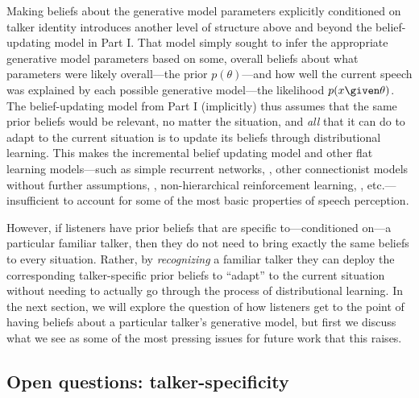 \label{r2-talker-spec-novelty}
Making beliefs about the generative model parameters explicitly conditioned on talker identity introduces another level of structure above and beyond the belief-updating model in Part I.  That model simply sought to infer the appropriate generative model parameters based on some, overall beliefs about what parameters were likely overall---the prior $p(\theta)$---and how well the current speech was explained by each possible generative model---the likelihood $p(x \given \theta)$.  The belief-updating model from Part I (implicitly) thus assumes that the same prior beliefs would be relevant, no matter the situation, and \emph{all} that it can do to adapt to the current situation is to update its beliefs through distributional learning.  This makes the incremental belief updating model and other flat learning models---such as simple recurrent networks, \autocite{Chang2006,Elman1990}, other connectionist models without further assumptions, \autocite{Mirman2006,Lancia2013}, non-hierarchical reinforcement learning, \autocite{Gallistel2001}, etc.---insufficient to account for some of the most basic properties of speech perception.

However, if listeners have prior beliefs that are specific to---conditioned on---a particular familiar talker, then they do not need to bring exactly the same beliefs to every situation.  Rather, by \emph{recognizing} a familiar talker they can deploy the corresponding talker-specific prior beliefs to ``adapt'' to the current situation without needing to actually go through the process of distributional learning.  In the next section, we will explore the question of how listeners get to the point of having beliefs about a particular talker's generative model, but first we discuss what we see as some of the most pressing issues for future work that this raises.

\subsection{Open questions: talker-specificity}
\label{sec:open-quest-talk}

